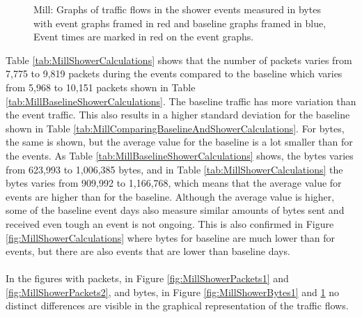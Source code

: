 \begin{figure}[H]
\begin{subfigure}[b]{0.47\textwidth}
    \end{subfigure}
        \begin{subfigure}[b]{0.47\textwidth}
        \centering
    \end{subfigure}
    \begin{subfigure}[b]{0.47\textwidth}
        \centering
    \end{subfigure}
    \begin{subfigure}[b]{0.47\textwidth}
        \centering
    \end{subfigure}
    \hspace{0.6cm}
    \begin{subfigure}[b]{0.47\textwidth}
    \centering
        \end{subfigure}
    \caption{Mill: Graphs of traffic flows in the shower events measured in bytes with event graphs framed in red and baseline graphs framed in blue, Event times are marked in red on the event graphs.}  
    \label{fig:MillShowerBytes2}
\end{figure}

Table \ref{tab:MillShowerCalculations} shows that the number of packets varies from 7,775 to 9,819 packets during the events compared to the baseline which varies from 5,968 to 10,151 packets shown in Table \ref{tab:MillBaselineShowerCalculations}. The baseline traffic has more variation than the event traffic. This also results in a higher standard deviation for the baseline shown in Table \ref{tab:MillComparingBaselineAndShowerCalculations}. For bytes, the same is shown, but the average value for the baseline is a lot smaller than for the events. As Table \ref{tab:MillBaselineShowerCalculations} shows, the bytes varies from 623,993 to 1,006,385 bytes, and in Table \ref{tab:MillShowerCalculations} the bytes varies from 909,992 to 1,166,768, which means that the average value for events are higher than for the baseline. Although the average value is higher, some of the baseline event days also measure similar amounts of bytes sent and received even tough an event is not ongoing. This is also confirmed in Figure \ref{fig:MillShowerCalculations} where bytes for baseline are much lower than for events, but there are also events that are lower than baseline days. 
\\\\
In the figures with packets, in Figure \ref{fig:MillShowerPackets1} and \ref{fig:MillShowerPackets2}, and bytes, in Figure \ref{fig:MillShowerBytes1} and \ref{fig:MillShowerBytes2} no distinct differences are visible in the graphical representation of the traffic flows. 

